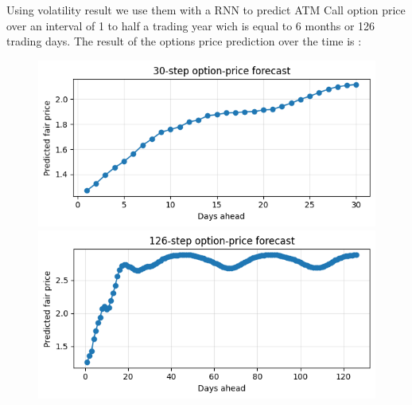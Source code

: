 \documentclass[letterpaper,11pt]{article}
\begin{document}
Using volatility result we use them with a RNN to predict ATM Call option price over an interval of 1 to half a trading year wich is equal to 6 months or 126 trading days. The result of the options price prediction over the time is :
\begin{figure}[H]
    \centering
    \begin{minipage}[b]{0.49\textwidth}
      \centering
      \includegraphics[width=\linewidth]{img/30_opt_forecast.png} 
    \end{minipage}
    \hfill
    \begin{minipage}[b]{0.49\textwidth}
      \centering
      \includegraphics[width=\linewidth]{img/126_opt_price.png}
    \end{minipage}
  \end{figure}
\end{document}
